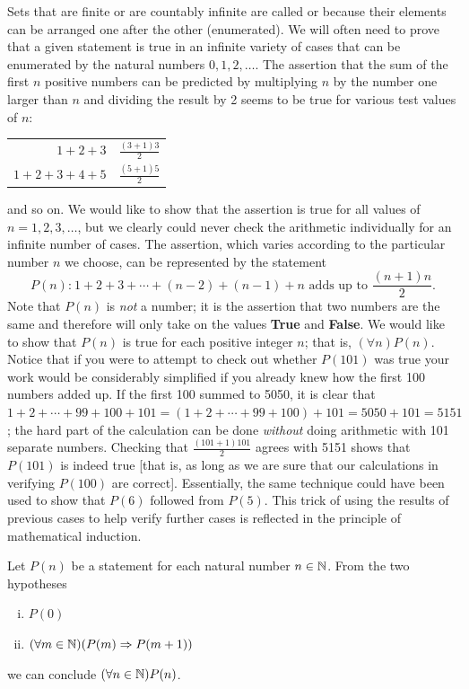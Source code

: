 Sets that are finite or are countably infinite are called
\emph{} or \emph{} because their elements can be
arranged one after the other (enumerated). We will often need to prove that a
given statement is true in an infinite variety of cases that can be enumerated
by the natural numbers $0,1,2,\ldots$. The assertion that the sum of the first
$n$ positive numbers can be predicted by multiplying $n$ by the number one
larger than $n$ and dividing the result by 2 seems to be true for various test
values of $n$:
\begin{center}\begin{tabular}{r@{ $=$ }l}
$1+2+3$ & $\frac{(3+1)3}{2}$ \\
$1+2+3+4+5$ & $\frac{(5+1)5}{2}$
\end{tabular}\end{center}
and so on. We would like to show that the assertion is true for all values of
$n = 1,2,3, \ldots$, but we clearly could never check the arithmetic
individually for an infinite number of cases. The assertion, which varies
according to the particular number $n$ we choose, can be represented by the
statement
\[P(n)\text{:}\ 1+2+3+\cdots+(n-2)+(n-1)+n\text{ adds up to }\frac{(n+1)n}{2}.\]
Note that $P(n)$ is \emph{not} a number; it is the assertion that two numbers are the
same and therefore will only take on the values \textbf{True} and \textbf{False}. We
would like to show that $P(n)$ is true for each positive integer $n$; that is,
$(\forall n)P(n)$. Notice that if you were to attempt to check out whether
$P(101)$ was true your work would be considerably simplified if you already knew
how the first 100 numbers added up. If the first 100 summed to 5050, it is clear
that $1+2+\cdots+99+100+101=(1+2+\cdots+99+100)+101=5050+101=5151$; the hard
part of the calculation can be done \emph{without} doing arithmetic with 101
separate numbers. Checking that $\frac{(101+1)101}{2}$ agrees with 5151 shows
that $P(101)$ is indeed true [that is, as long as we are sure that our
calculations in verifying $P(100)$ are correct]. Essentially, the same technique
could have been used to show that $P(6)$ followed from $P(5)$. This trick of
using the results of previous cases to help verify further cases is reflected in
the principle of mathematical induction.

\begin{thm}\label{thm-0.5}
Let $P(n)$ be a statement for each natural number $n \in \mathbb{N}$. From the two
hypotheses
\begin{enumerate}[i.]
\item $P(0)$
\item $(\forall m \in \mathbb{N})(P(m) \Rightarrow P(m + 1))$
\end{enumerate}
we can conclude $(\forall n \in \mathbb{N})P(n)$.
\end{thm}

